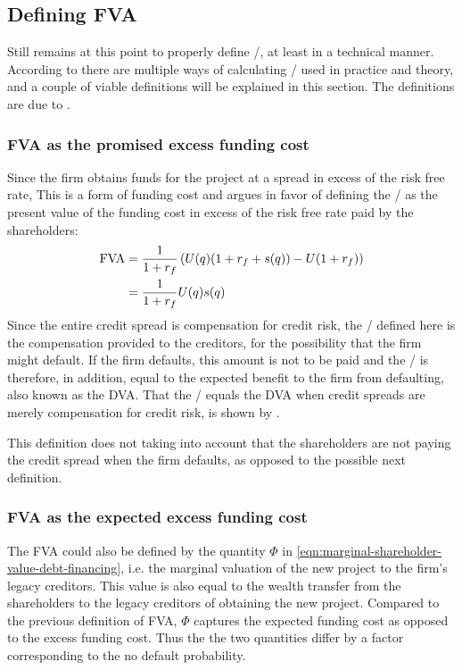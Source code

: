 \documentclass[../main.tex]{subfiles}
\begin{document}
    \subsection{Defining FVA}
        Still remains at this point to properly define \FVA/, at least in a technical manner.
        According to \cite{ADS2019} there are multiple ways of calculating \FVA/ used in practice and theory,
        and a couple of viable definitions will be explained in this section.
        The definitions are due to \cite{Hillion2016}.

        \subsubsection{FVA as the promised excess funding cost}
            Since the firm obtains funds for the project at a spread in excess of the risk free rate, 
            This is a form of funding cost and argues in favor of defining the \FVA/ as
            the present value of the funding cost in excess of the risk free rate paid by the shareholders:
            \begin{align}
                \FVA/ 
                &= \discountfactor \left(
                    U(q) (1 + \rfrate + s(q))
                    - U (1 + \rfrate)
                \right) 
                \nonumber \\
                &= \discountfactor U(q) s(q)
                \label{eqn:fva-as-promised-excess-funding-cost}
            \end{align}
            Since the entire credit spread is compensation for credit risk,
            the \FVA/ defined here is the compensation provided to the creditors,
            for the possibility that the firm might default. 
            If the firm defaults, this amount is not to be paid and the \FVA/ is therefore, in addition, 
            equal to the expected benefit to the firm from defaulting, also known as the DVA. 
            That the \FVA/ equals the DVA when credit spreads are merely compensation for credit risk, 
            is shown by \cite{HullWhiteFVA}.

            This definition does not taking into account that the shareholders are not paying the credit spread
            when the firm defaults, as opposed to the possible next definition.

        \subsubsection{FVA as the expected excess funding cost}
            The FVA could also be defined by the quantity $\Phi$ in \cref{eqn:marginal-shareholder-value-debt-financing}, 
            i.e. the marginal valuation of the new project to the firm's legacy creditors. 
            This value is also equal to the wealth transfer from the shareholders to the legacy creditors
            of obtaining the new project.
            Compared to the previous definition of FVA, 
            $\Phi$ captures the expected funding cost as opposed to the excess funding cost.
            Thus the the two quantities differ by a factor corresponding to the no default probability.
\end{document}
